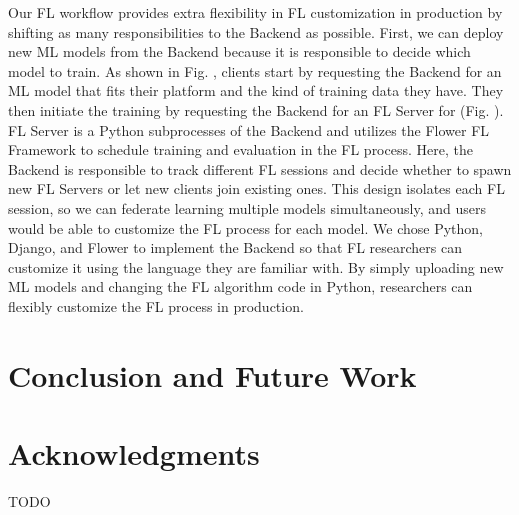 \documentclass[letterpaper]{article} %
\begin{document}
Our FL workflow provides extra flexibility in FL customization in production by
shifting as many responsibilities to the Backend as possible.
First, we can deploy new ML models from the Backend because
it is responsible to decide which model to train.
As shown in Fig. , %
clients start by requesting the Backend for an ML model \model{} that fits
their platform and the kind of training data they have.
They then initiate the training by requesting the Backend for
an FL Server \fs{} for \model{}
(Fig. ). %
FL Server \fs{} is a Python subprocesses of the Backend and
utilizes the Flower FL Framework to
schedule training and evaluation in the FL process.
Here, the Backend is responsible to track different FL sessions and
decide whether
to spawn new FL Servers or let new clients join existing ones.
This design isolates each FL session,
so we can federate learning multiple models simultaneously, and
users would be able to customize the FL process for each model.
We chose Python, Django, and Flower to implement the Backend so that
FL researchers can customize it using the language they are familiar with.
By simply uploading new ML models and
changing the FL algorithm code in Python,
researchers can flexibly customize the FL process in production.


\section{Conclusion and Future Work}


\appendix

\section*{Acknowledgments}
TODO

\bigskip


\end{document}
